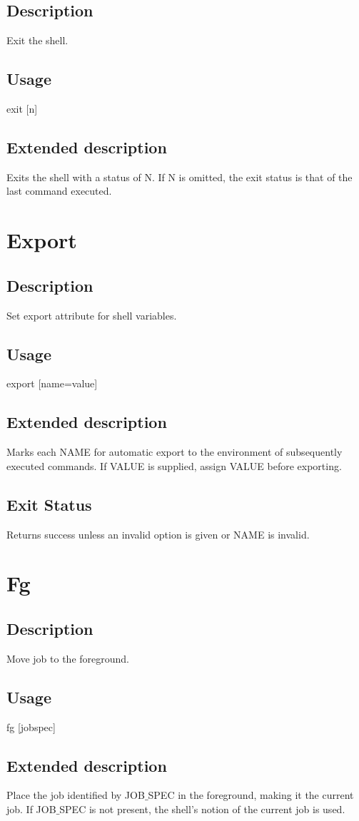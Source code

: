 \documentclass[12pt,a4paper]{report}
\begin{document}
\section{Description}
Exit the shell.
\section{Usage}
exit [n]
\section{Extended description}
Exits the shell with a status of N.  If N is omitted, the exit status is that of the last command executed.
\newpage

\chapter{Export}
\section{Description}
Set export attribute for shell variables.
\section{Usage}
export [name=value]
\section{Extended description}
Marks each NAME for automatic export to the environment of subsequently executed commands.  If VALUE is supplied, assign VALUE before exporting.
\section{Exit Status}
Returns success unless an invalid option is given or NAME is invalid.
\newpage

\chapter{Fg}
\section{Description}
Move job to the foreground.
\section{Usage}
fg [jobspec]
\section{Extended description}
Place the job identified by JOB$\_$SPEC in the foreground, making it the current job.  If JOB$\_$SPEC is not present, the shell's notion of the current job is used.
\end{document}
